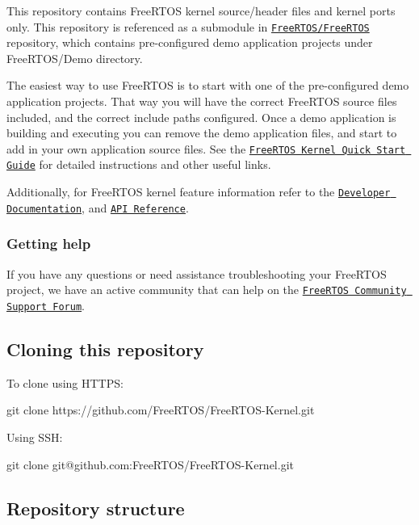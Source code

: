 This repository contains Free\+R\+T\+OS kernel source/header files and kernel ports only. This repository is referenced as a submodule in \href{https://github.com/FreeRTOS/FreeRTOS}{\tt Free\+R\+T\+O\+S/\+Free\+R\+T\+OS} repository, which contains pre-\/configured demo application projects under {\ttfamily Free\+R\+T\+O\+S/\+Demo} directory.

The easiest way to use Free\+R\+T\+OS is to start with one of the pre-\/configured demo application projects. That way you will have the correct Free\+R\+T\+OS source files included, and the correct include paths configured. Once a demo application is building and executing you can remove the demo application files, and start to add in your own application source files. See the \href{https://www.FreeRTOS.org/FreeRTOS-quick-start-guide.html}{\tt Free\+R\+T\+OS Kernel Quick Start Guide} for detailed instructions and other useful links.

Additionally, for Free\+R\+T\+OS kernel feature information refer to the \href{https://www.FreeRTOS.org/features.html}{\tt Developer Documentation}, and \href{https://www.FreeRTOS.org/a00106.html}{\tt A\+PI Reference}.

\subsubsection*{Getting help}

If you have any questions or need assistance troubleshooting your Free\+R\+T\+OS project, we have an active community that can help on the \href{https://forums.freertos.org}{\tt Free\+R\+T\+OS Community Support Forum}.

\subsection*{Cloning this repository}

To clone using H\+T\+T\+PS\+: 
\begin{DoxyCode}
git clone https://github.com/FreeRTOS/FreeRTOS-Kernel.git
\end{DoxyCode}
 Using S\+SH\+: 
\begin{DoxyCode}
git clone git@github.com:FreeRTOS/FreeRTOS-Kernel.git
\end{DoxyCode}


\subsection*{Repository structure}


